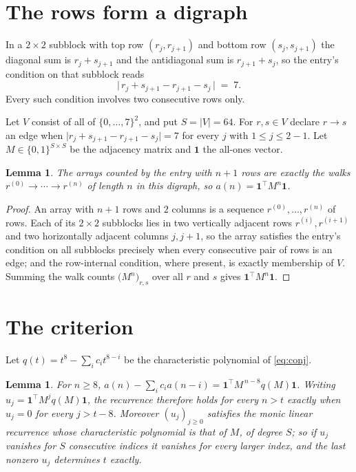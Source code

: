 \documentclass[11pt,a4paper]{article}
\theoremstyle{plain}
\newtheorem{lemma}[theorem]{Lemma}
\theoremstyle{definition}
\begin{document}
\section{The rows form a digraph}

In a $2\times2$ subblock with top row $(r_j,r_{j+1})$ and bottom row $(s_j,s_{j+1})$ the
diagonal sum is $r_j+s_{j+1}$ and the antidiagonal sum is $r_{j+1}+s_j$, so the entry's
condition on that subblock reads
\[
\bigl|\,r_j+s_{j+1}-r_{j+1}-s_j\,\bigr|\;=\;7.
\]
Every such condition involves two consecutive rows only.

Let $V$ consist of all of $\{0,\dots,7\}^{2}$, and put $S=|V|=64$. For $r,s\in V$ declare $r\to s$ an edge
when $\bigl|r_j+s_{j+1}-r_{j+1}-s_j\bigr|=7$ for every $j$ with
$1\le j\le2-1$. Let $M\in\{0,1\}^{S\times S}$ be the adjacency matrix and $\mathbf{1}$
the all-ones vector.

\begin{lemma}\label{lem:walk}
The arrays counted by the entry with $n+1$ rows are exactly the walks
$r^{(0)}\to\cdots\to r^{(n)}$ of length $n$ in this digraph, so
$a(n)=\mathbf{1}^{\!\top}M^{n}\mathbf{1}$.
\end{lemma}

\begin{proof}
An array with $n+1$ rows and $2$ columns is a sequence $r^{(0)},\dots,r^{(n)}$ of
rows. Each of its $2\times2$ subblocks lies in two vertically adjacent rows
$r^{(i)},r^{(i+1)}$ and two horizontally adjacent columns $j,j+1$, so the array satisfies
the entry's condition on all subblocks precisely when every consecutive pair of rows is an
edge; and the row-internal condition, where present, is exactly membership of $V$. Summing
the walk counts $\bigl(M^{n}\bigr)_{r,s}$ over all $r$ and $s$ gives
$\mathbf{1}^{\!\top}M^{n}\mathbf{1}$.
\end{proof}

\section{The criterion}

Let $q(t)=t^{8}-\sum_i c_i t^{8-i}$ be the characteristic polynomial of
\eqref{eq:conj}.

\begin{lemma}\label{lem:crit}
For $n\ge8$,
$a(n)-\sum_i c_i a(n-i)=\mathbf{1}^{\!\top}M^{\,n-8}q(M)\mathbf{1}$. Writing
$u_j=\mathbf{1}^{\!\top}M^{j}q(M)\mathbf{1}$, the recurrence therefore holds for every
$n>t$ exactly when $u_j=0$ for every $j>t-8$. Moreover $(u_j)_{j\ge0}$ satisfies the
monic linear recurrence whose characteristic polynomial is that of $M$, of degree $S$; so
if $u_j$ vanishes for $S$ consecutive indices it vanishes for every larger index, and the
last nonzero $u_j$ determines $t$ exactly.
\end{lemma}
\end{document}
